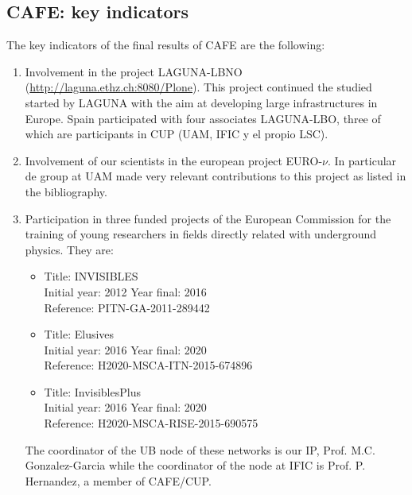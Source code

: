 \subsection*{CAFE: key indicators}

%
The key indicators of the final results of CAFE are the following:

\begin{enumerate}
\item Involvement in the project LAGUNA-LBNO
(\url{http://laguna.ethz.ch:8080/Plone}). This project continued the
studied started by LAGUNA with the aim at developing large infrastructures
in Europe. Spain participated with four associates LAGUNA-LBO, three of
which are participants in CUP (UAM, IFIC y el propio LSC).
\item Involvement of our scientists in the european project EURO-$\nu$.
In particular de group at UAM made very relevant contributions to
this project as listed in the bibliography.
\item Participation in three funded projects of the European Commission
for the training of young researchers in fields directly related
with underground physics. They are: 
\begin{itemize}
\item 
Title: INVISIBLES\\
Initial year: 2012 Year final: 2016\\
Reference: PITN-GA-2011-289442\\
\item 
Title: 	Elusives\\
Initial year: 2016 Year final: 2020\\
Reference: H2020-MSCA-ITN-2015-674896 \\
\item  Title: 	InvisiblesPlus\\
Initial year: 2016 Year final: 2020\\
Reference: H2020-MSCA-RISE-2015-690575\\
\end{itemize}
The coordinator of the UB node of these networks is our IP, Prof.
M.C. Gonzalez-Garcia while the coordinator of the node at IFIC
is Prof. P. Hernandez, a member of CAFE/CUP.

\end{enumerate}
